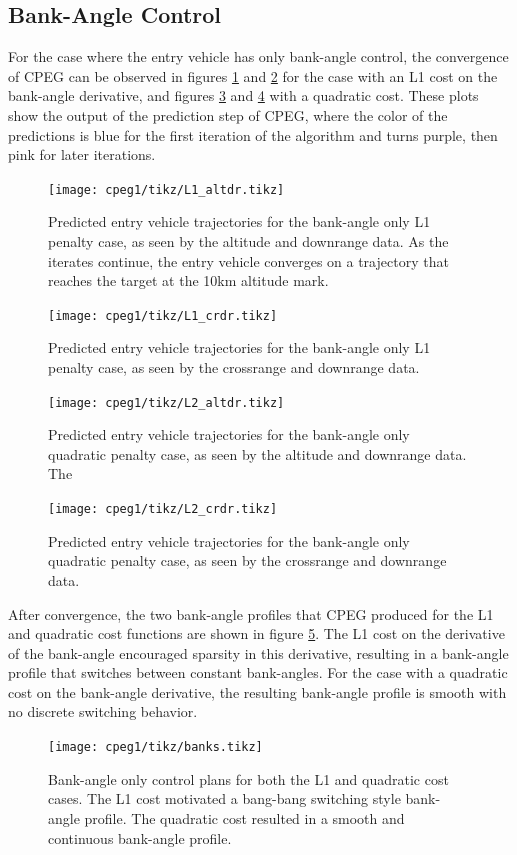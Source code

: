 \subsection{Bank-Angle Control}
For the case where the entry vehicle has only bank-angle control, the convergence of CPEG can be observed in figures \ref{fig:l1alt} and \ref{fig:l1crdr} for the case with an L1 cost on the bank-angle derivative, and figures \ref{fig:l2alt} and \ref{fig:l2crdr} with a quadratic cost.  These plots show the output of the prediction step of CPEG, where the color of the predictions is blue for the first iteration of the algorithm and turns purple, then pink for later iterations.
\begin{figure}
    \centering
    \texttt{[image: cpeg1/tikz/L1\_altdr.tikz]}
    \caption{Predicted entry vehicle trajectories for the bank-angle only L1 penalty case, as seen by the altitude and downrange data. As the iterates continue, the entry vehicle converges on a trajectory that reaches the target at the 10km altitude mark.} 
    \label{fig:l1alt}
\end{figure}
\begin{figure}
    \centering
    \texttt{[image: cpeg1/tikz/L1\_crdr.tikz]}
    \caption{Predicted entry vehicle trajectories for the bank-angle only L1 penalty case, as seen by the crossrange and downrange data.}
    \label{fig:l1crdr}
\end{figure}
  \begin{figure}
    \centering
    \texttt{[image: cpeg1/tikz/L2\_altdr.tikz]}
    \caption{Predicted entry vehicle trajectories for the bank-angle only quadratic penalty case, as seen by the altitude and downrange data. The}
    \label{fig:l2alt}
\end{figure}
\begin{figure}
    \centering
    \texttt{[image: cpeg1/tikz/L2\_crdr.tikz]}
    \caption{Predicted entry vehicle trajectories for the bank-angle only quadratic penalty case, as seen by the crossrange and downrange data.}
    \label{fig:l2crdr}
\end{figure}
After convergence, the two bank-angle profiles that CPEG produced for the L1 and quadratic cost functions are shown in figure \ref{fig:banks}. The L1 cost on the derivative of the bank-angle encouraged sparsity in this derivative, resulting in a bank-angle profile that switches between constant bank-angles. For the case with a quadratic cost on the bank-angle derivative, the resulting bank-angle profile is smooth with no discrete switching behavior.
\begin{figure}
    \centering
    \texttt{[image: cpeg1/tikz/banks.tikz]}
    \caption{Bank-angle only control plans for both the L1 and quadratic cost cases. The L1 cost motivated a bang-bang switching style bank-angle profile. The quadratic cost resulted in a smooth and continuous bank-angle profile.}
    \label{fig:banks}
\end{figure}
